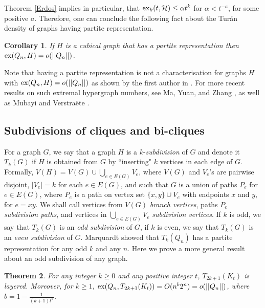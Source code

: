 \documentclass[11pt, a4paper]{article}
\newtheorem{theorem}{Theorem}
\newtheorem{corollary}[theorem]{Corollary}
\newcommand{\cH}{\mathcal{H}}
\newcommand{\ex}{{\rm  ex}}
\begin{document}
Theorem \ref{Erdos}
implies in particular, that  $\ex_k(t, \cH) \leq \alpha t^k$  for  $\alpha < t^{-a}$, for some positive $a$. Therefore, one can conclude the following fact about the Tur\'an density of graphs having partite representation.

\begin{corollary} 
If $H$ is a cubical graph  that has a  partite representation then $\ex(Q_n, H)= o(||Q_n||)$.
\end{corollary}

Note that having a partite representation is not a characterisation for graphs $H$ with $\ex(Q_n, H)= o(||Q_n||)$ as shown by the first author in \cite{MA1}.
For more recent results on such extremal hypergraph numbers, see Ma, Yuan, and  Zhang  \cite{MYZ}, as well as Mubayi and Verstra\"ete \cite{MV}.


				
\subsection{Subdivisions of cliques and bi-cliques}	


For a graph $G$, we say that a graph $H$ is a $k$-{\it subdivision} of $G$ and denote it  $T_k(G)$ if $H$ is obtained from $G$ by ``inserting" $k$ vertices in each edge of $G$. Formally, 
$V(H)= V(G)\cup \bigcup_{e\in E(G)} V_e$, where $V(G)$ and $V_e$'s are pairwise disjoint, $|V_e|=k$ for each $e\in E(G)$,  and such that $G$ is a union of paths $P_e$ for $e\in E(G)$, where $P_e$ is a path on vertex set $\{x, y\}\cup V_e$ with endpoints $x$ and $y$, for $e=xy$. We shall call vertices from $V(G)$ {\it branch vertices},
paths $P_e$ {\it subdivision paths}, and vertices in $\bigcup_{e\in E(G)} V_e$ {\it subdivision vertices}. If $k$ is odd, we say that $T_k(G)$ is an {\it odd subdivision} of $G$, if 
$k$ is even, we say that $T_k(G)$ is an {\it even subdivision} of $G$.
Marquardt \cite{M} showed that $T_k(Q_n)$ has a partite representation for any odd $k$ and any $n$. Here we prove a more general result about an odd subdivision of any graph.
		


	
\begin{theorem}\label{complete}
For any integer $k\geq 0$ and any positive integer $t$, $T_{2k+1}(K_t)$ is  layered. Moreover,  for $k\geq 1$, 
$\ex(Q_n, T_{2k+1}(K_t)) = O(n^b2^n)= o(||Q_n||)$, where $b=1-\frac{1}{(k+1)t^k}$.
\end{theorem}		
\end{document}
